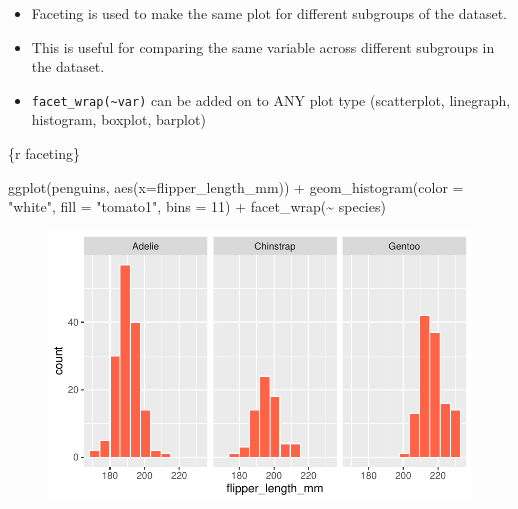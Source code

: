 \documentclass[
  letterpaper,
  DIV=11,
  numbers=noendperiod]{scrreprt}
\newenvironment{Shaded}{\begin{snugshade}}{\end{snugshade}}
\newcommand{\AttributeTok}[1]{\textcolor[rgb]{0.40,0.45,0.13}{#1}}
\newcommand{\DecValTok}[1]{\textcolor[rgb]{0.68,0.00,0.00}{#1}}
\newcommand{\FunctionTok}[1]{\textcolor[rgb]{0.28,0.35,0.67}{#1}}
\newcommand{\InformationTok}[1]{\textcolor[rgb]{0.37,0.37,0.37}{#1}}
\newcommand{\NormalTok}[1]{\textcolor[rgb]{0.00,0.23,0.31}{#1}}
\newcommand{\SpecialCharTok}[1]{\textcolor[rgb]{0.37,0.37,0.37}{#1}}
\newcommand{\StringTok}[1]{\textcolor[rgb]{0.13,0.47,0.30}{#1}}
\begin{document}
\begin{tcolorbox}[enhanced jigsaw, breakable, colback=white, bottomrule=.15mm, leftrule=.75mm, colframe=quarto-callout-note-color-frame, arc=.35mm, rightrule=.15mm, toprule=.15mm, left=2mm, opacityback=0]

\begin{itemize}
\item
  Faceting is used to make the same plot for different subgroups of the
  dataset.
\item
  This is useful for comparing the same variable across different
  subgroups in the dataset.
\item
  \texttt{facet\_wrap(\textasciitilde{}var)} can be added on to ANY plot
  type (scatterplot, linegraph, histogram, boxplot, barplot)
\end{itemize}

\begin{Shaded}
\begin{Highlighting}[]
\InformationTok{\textasciigrave{}\textasciigrave{}\textasciigrave{}\{r faceting\}}

\FunctionTok{ggplot}\NormalTok{(penguins, }\FunctionTok{aes}\NormalTok{(}\AttributeTok{x=}\NormalTok{flipper\_length\_mm)) }\SpecialCharTok{+}
    \FunctionTok{geom\_histogram}\NormalTok{(}\AttributeTok{color =} \StringTok{"white"}\NormalTok{, }\AttributeTok{fill =} \StringTok{"tomato1"}\NormalTok{, }\AttributeTok{bins =} \DecValTok{11}\NormalTok{) }\SpecialCharTok{+}
    \FunctionTok{facet\_wrap}\NormalTok{(}\SpecialCharTok{\textasciitilde{}}\NormalTok{ species)}
\InformationTok{\textasciigrave{}\textasciigrave{}\textasciigrave{}}
\end{Highlighting}
\end{Shaded}

\begin{figure}[H]

{\centering \includegraphics{04-content_files/figure-pdf/faceting-1.pdf}

}

\end{figure}

\end{tcolorbox}
\end{document}
